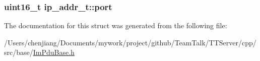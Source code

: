 \subsubsection[{port}]{\setlength{\rightskip}{0pt plus 5cm}uint16\+\_\+t ip\+\_\+addr\+\_\+t\+::port}\label{structip__addr__t_a26a6b3b56225b809b62e97ee9693fe65}


The documentation for this struct was generated from the following file\+:\begin{DoxyCompactItemize}
\item 
/\+Users/chenjiang/\+Documents/mywork/project/github/\+Team\+Talk/\+T\+T\+Server/cpp/src/base/\hyperlink{_im_pdu_base_8h}{Im\+Pdu\+Base.\+h}\end{DoxyCompactItemize}
